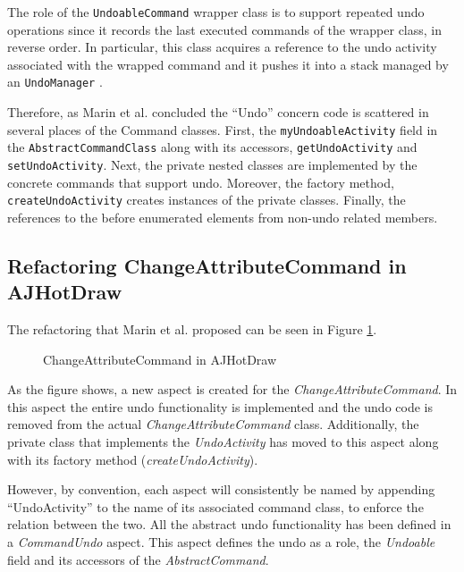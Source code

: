 The role of the \texttt{UndoableCommand} wrapper class is to support repeated undo operations since it records the last executed commands of the wrapper class, in reverse order.
In particular, this class acquires a reference to the undo activity associated with the wrapped command and it pushes it into a stack managed by an \texttt{UndoManager} \cite{marin2004refactoring}.

Therefore, as Marin et al. concluded \cite{marin2004identifying} the ``Undo'' concern code is scattered in several places of the Command classes.
First, the \texttt{myUndoableActivity} field in the \texttt{AbstractCommandClass} along with its accessors, \texttt{getUndoActivity} and \texttt{setUndoActivity}.
Next, the private nested classes are implemented by the concrete commands that support undo.
Moreover, the factory method, \texttt{createUndoActivity} creates instances of the private classes.
Finally, the references to the before enumerated elements from non-undo related members.

\subsection{Refactoring ChangeAttributeCommand in AJHotDraw}
The refactoring that Marin et al. proposed can be seen in Figure \ref{fig:JHotDraw_Undo_Command_ChangeAttributeCommand_AOP}.

\begin{figure} [H]
	\centering
  	\caption{ChangeAttributeCommand in AJHotDraw}
  	\label{fig:JHotDraw_Undo_Command_ChangeAttributeCommand_AOP}
\end{figure}

As the figure shows, a new aspect is created for the \textit{ChangeAttributeCommand}.
In this aspect the entire undo functionality is implemented and the undo code is removed from the actual \textit{ChangeAttributeCommand} class. 
Additionally, the private class that implements the \textit{UndoActivity} has moved to this aspect along with its factory method (\textit{createUndoActivity}).

However, by convention, each aspect will consistently be named by appending ``UndoActivity'' to the name of its associated command class, to enforce the relation between the two.
All the abstract undo functionality has been defined in a \textit{CommandUndo} aspect.
This aspect defines the undo as a role, the \textit{Undoable} field and its accessors of the \textit{AbstractCommand}.


